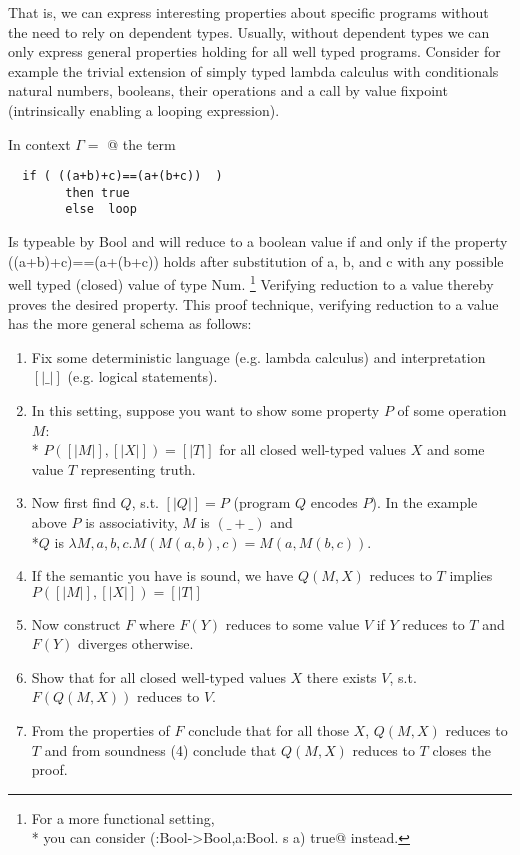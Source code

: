 \documentclass[runningheads]{llncs}
\begin{document}
That is, we can express interesting properties about specific programs without the need to rely on dependent types. Usually, without dependent types we can only express general properties holding for all well typed programs.
Consider for example the trivial extension of simply typed lambda calculus with conditionals natural numbers, booleans, their operations and a call by value fixpoint (intrinsically enabling a looping expression).

In context $\Gamma = $ @ the term
\begin{lstlisting}
  if ( ((a+b)+c)==(a+(b+c))  )
        then true
        else  loop
\end{lstlisting}
Is typeable by Bool and will reduce to a boolean value if and only if the property ((a+b)+c)==(a+(b+c)) holds after substitution of a, b, and c with any possible well typed (closed) value of type Num.
\footnote{For a more functional setting,\\* you can consider \Q@fix (\s:Bool->Bool,a:Bool. s a)  true@ instead.}
Verifying reduction to a value thereby proves the desired property.
This proof technique, verifying reduction to a value has the more general schema as follows:
\begin{enumerate}
\item Fix some deterministic language (e.g. lambda calculus) and interpretation $[| \_  |]$ (e.g. logical statements).
\item In this setting, suppose you want to show some property $P$ of some operation $M$:
\\* $P([|M|], [|X|]) = [|T|]$
for all closed well-typed values $X$ and some value $T$ representing truth.

\item Now first find $Q$, s.t. $[|Q|] = P$ (program $Q$ encodes $P$). 
In the example above $P$ is associativity, $M$ is $(\_+\_)$ and 
\\*$Q$ is  $\lambda M, a, b, c . M(M(a,b),c)=M(a,M(b,c))$.
\item If the semantic you have is sound, we have
$Q(M, X)$ reduces to $T$ implies $P([|M|], [|X|]) = [|T|]$

\item Now construct $F$ where $F(Y)$ reduces to some value $V$ if $Y$ reduces to $T$ and $F(Y)$ diverges otherwise.
\item Show that for all closed well-typed values $X$ there exists $V$, s.t. $F(Q(M, X))$ reduces to $V$.
\item From the properties of $F$ conclude that for all those $X$, $Q(M, X)$ reduces to $T$ and from soundness (4) conclude that $Q(M, X)$ reduces to $T$ closes the proof.

\end{enumerate}
\end{document}
